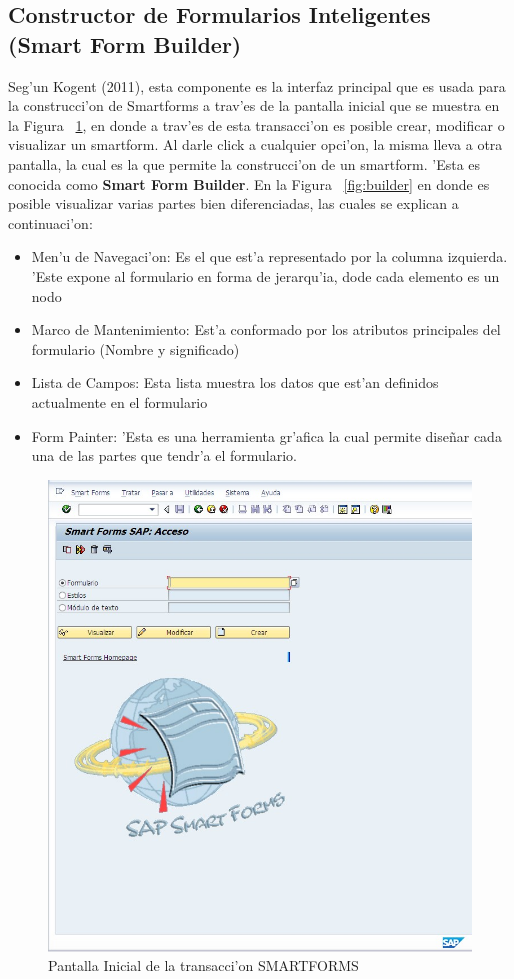 \subsection{Constructor de Formularios Inteligentes (Smart Form Builder)}
	Seg'un Kogent (2011), esta componente es la interfaz principal que es usada para la construcci'on de Smartforms a trav'es de la pantalla inicial que se muestra en la Figura ~\ref{fig:smartforms1}, en donde a trav'es de esta transacci'on es posible crear, modificar o visualizar un smartform. Al darle click a cualquier opci'on, la misma lleva a otra pantalla, la cual es la que permite la construcci'on de un smartform. 'Esta es conocida como \textbf{Smart Form Builder}. En la Figura ~\ref{fig:builder} en donde es posible visualizar varias partes bien diferenciadas, las cuales se explican a continuaci'on:
\begin{itemize}
\item Men'u de Navegaci'on: Es el que est'a representado por la columna izquierda. 'Este expone al formulario en forma de jerarqu'ia, dode cada elemento es un nodo
\item Marco de Mantenimiento: Est'a conformado por los atributos principales del formulario (Nombre y significado)
\item Lista de Campos: Esta lista muestra los datos que est'an definidos actualmente en el formulario
\item Form Painter: 'Esta es una herramienta gr'afica la cual permite dise\~nar cada una de las partes que tendr'a el formulario.
\end{itemize}
\begin{figure}[H]
\centering
\includegraphics[scale=0.65,type=jpg,ext=.jpg,read=.jpg]{figures/sm_initial}
\caption{Pantalla Inicial de la transacci'on SMARTFORMS}
\label{fig:smartforms1}
\end{figure}


